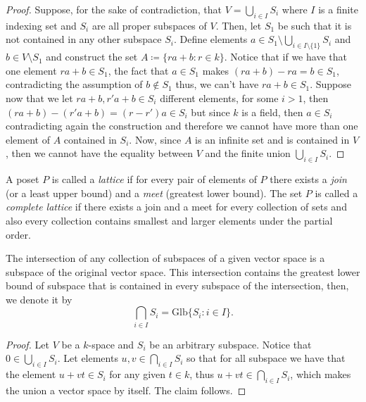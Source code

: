\begin{proof}
Suppose, for the sake of contradiction, that \(V = \bigcup_{i \in  I} S_i\)
where \(I\) is a finite indexing set and \(S_i\) are all proper subspaces of
\(V\). Then, let \(S_1\) be such that it is not contained in any other
subspace \(S_i\). Define elements \(a \in S_1 \setminus \bigcup_{i \in
I \setminus \{1\} } S_i \) and \(b \in V \setminus S_1\) and construct the
set \(A \coloneq \{ra + b \colon r \in k\}\). Notice that if we have that one element
\(ra + b \in S_1\), the fact that \(a \in S_1\) makes \((ra + b) - ra = b
\in S_1\), contradicting the assumption of \(b \not\in S_1\) thus, we can't
have \(ra + b \in S_1\). Suppose now that we let \(ra + b, r'a + b \in S_i\)
different elements, for some \(i > 1\), then \((ra + b) - (r'a + b) = (r -
r')a \in S_i\) but since \(k\) is a field, then \(a \in S_i\) contradicting
again the construction and therefore we cannot have more than one element of
\(A\) contained in \(S_i\). Now, since \(A\) is an infinite set and is
contained in \(V\), then we cannot have the equality between \(V\) and the
finite union \(\bigcup_{i \in  I} S_i\).
\end{proof}

\begin{definition}[Lattice]\label{def: lattice}
A poset \(P\) is called a \emph{lattice} if for every pair of
elements of \(P\) there exists a \emph{join} (or a least upper bound) and a
\emph{meet} (greatest lower bound). The set \(P\) is called a \emph{complete
lattice} if there exists a join and a meet for every collection of sets and
also every collection contains smallest and larger elements under the partial
order.
\end{definition}

\begin{proposition}\label{prop: intersection of subspaces}
The intersection of any collection of subspaces of a given vector space is a
subspace of the original vector space. This intersection contains the
greatest lower bound of subspace that is contained in every subspace of the
intersection, then, we denote it by
\[
  \bigcap_{i \in  I} S_i = \mathrm{Glb}\{S_i \colon i \in I\}.
\]
\end{proposition}

\begin{proof}
Let \(V\) be a \(k\)-space and \(S_i\) be an arbitrary subspace. Notice that
\(0 \in \bigcup_{i \in  I} S_i\). Let elements \(u, v \in \bigcap_{i \in  I}
S_i\) so that for all subspace we have that the element \(u + vt \in S_i\)
for any given \(t \in k\), thus \(u + vt \in \bigcap_{i \in  I} S_i\), which
makes the union a vector space by itself. The claim follows.
\end{proof}

